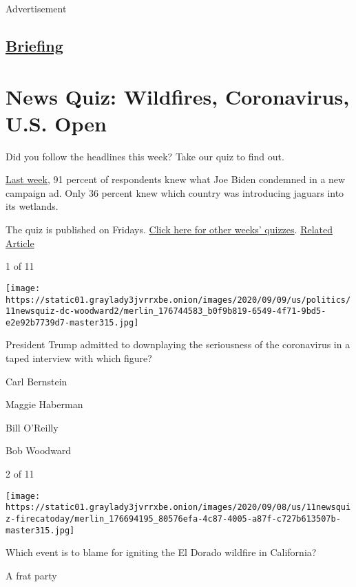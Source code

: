 Advertisement

\hypertarget{-briefing-}{%
\subsection{\texorpdfstring{
\href{/interactive/2018/briefing/global-morning-briefing-newsletter-signup.html}{Briefing}
}{ Briefing }}\label{-briefing-}}

\hypertarget{news-quiz-wildfires-coronavirus-us-open}{%
\section{News Quiz: Wildfires, Coronavirus, U.S.
Open}\label{news-quiz-wildfires-coronavirus-us-open}}

Did you follow the headlines this week? Take our quiz to find out.

\href{https://www.nytimes3xbfgragh.onion/interactive/2020/09/04/briefing/protests-russians-chadwick-boseman.html}{Last
week}, 91 percent of respondents knew what Joe Biden condemned in a new
campaign ad. Only 36 percent knew which country was introducing jaguars
into its wetlands.

The quiz is published on Fridays.
\href{https://www.nytimes3xbfgragh.onion/spotlight/news-quiz}{Click here
for other weeks' quizzes}.
\href{https://www.nytimes3xbfgragh.onion/interactive/2020/09/04/briefing/protests-russians-chadwick-boseman.html}{Related
Article}

1 of 11

\texttt{[image: https://static01.graylady3jvrrxbe.onion/images/2020/09/09/us/politics/11newsquiz-dc-woodward2/merlin\_176744583\_b0f9b819-6549-4f71-9bd5-e2e92b7739d7-master315.jpg]}

President Trump admitted to downplaying the seriousness of the
coronavirus in a taped interview with which figure?

Carl Bernstein

Maggie Haberman

Bill O'Reilly

Bob Woodward

2 of 11

\texttt{[image: https://static01.graylady3jvrrxbe.onion/images/2020/09/08/us/11newsquiz-firecatoday/merlin\_176694195\_80576efa-4c87-4005-a87f-c727b613507b-master315.jpg]}

Which event is to blame for igniting the El Dorado wildfire in
California?

A frat party

